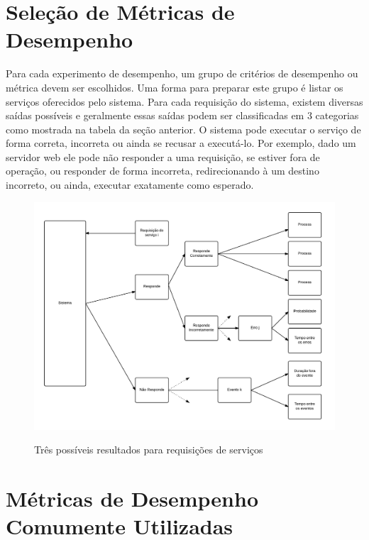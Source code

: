     
\section{Seleção de Métricas de Desempenho}
    
    Para cada experimento de desempenho, um grupo de critérios de desempenho ou métrica devem ser escolhidos.
    Uma forma para preparar este grupo é listar os serviços oferecidos pelo sistema. Para cada requisição do sistema, existem diversas saídas possíveis e geralmente essas saídas podem ser classificadas em 3 categorias como mostrada na tabela da seção anterior.
    O sistema pode executar o serviço de forma correta, incorreta ou ainda se recusar a executá-lo. Por exemplo, dado um servidor web ele pode não responder a uma requisição, se estiver fora de operação, ou responder de forma incorreta, redirecionando à um destino incorreto, ou ainda, executar exatamente como esperado.
    
    \begin{figure}[htb]
    \centering
    \includegraphics[scale=0.65]{imagens/saidarequisicao.pdf}
    \caption{Três possíveis resultados para requisições de serviços} \cite[p. 33]{Jain}
    \end{figure}

\section{Métricas de Desempenho Comumente Utilizadas}
\label{sec:metricas}
    
